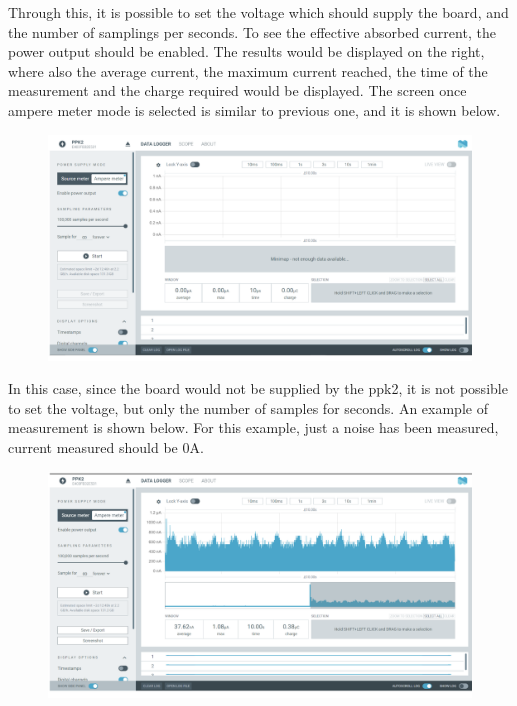 \documentclass{Configuration_Files/PoliMi3i_thesis}
\begin{document}
Through this, it is possible to set the voltage which should supply the board, and the number of samplings per seconds. To see the effective absorbed current, the power output should be enabled. The results would be displayed on the right, where also the average current, the maximum current reached, the time of the measurement and the charge required would be displayed.
The screen once ampere meter mode is selected is similar to previous one, and it is shown below.

\begin{figure}[H]
    \centering
    \includegraphics[scale=0.3]{Test_Procedure/13.png}
    \label{fig:direct_communication_board_PC}
\end{figure}

In this case, since the board would not be supplied by the ppk2, it is not possible to set the voltage, but only the number of samples for seconds.
An example of measurement is shown below. For this example, just a noise has been measured, current measured should be 0A. 

\begin{figure}[H]
    \centering
    \includegraphics[scale=0.3]{Test_Procedure/14.png}
    \label{fig:direct_communication_board_PC}
\end{figure}
\end{document}

